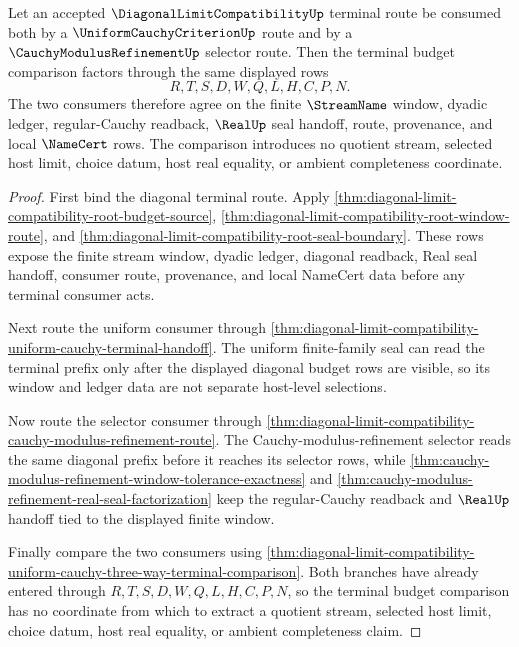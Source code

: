 \begin{theorem}
\label{thm:diagonal-limit-compatibility-terminal-modulus-budget-comparison}
Let an accepted $\DiagonalLimitCompatibilityUp$ terminal route be consumed both by a $\UniformCauchyCriterionUp$ route and by a $\CauchyModulusRefinementUp$ selector route. Then the terminal budget comparison factors through the same displayed rows
$$
R,T,S,D,W,Q,L,H,C,P,N.
$$
The two consumers therefore agree on the finite $\StreamName$ window, dyadic ledger, regular-Cauchy readback, $\RealUp$ seal handoff, route, provenance, and local $\NameCert$ rows. The comparison introduces no quotient stream, selected host limit, choice datum, host real equality, or ambient completeness coordinate.
\end{theorem}
\begin{proof}
First bind the diagonal terminal route. Apply \autoref{thm:diagonal-limit-compatibility-root-budget-source}, \autoref{thm:diagonal-limit-compatibility-root-window-route}, and \autoref{thm:diagonal-limit-compatibility-root-seal-boundary}. These rows expose the finite stream window, dyadic ledger, diagonal readback, Real seal handoff, consumer route, provenance, and local NameCert data before any terminal consumer acts.

Next route the uniform consumer through \autoref{thm:diagonal-limit-compatibility-uniform-cauchy-terminal-handoff}. The uniform finite-family seal can read the terminal prefix only after the displayed diagonal budget rows are visible, so its window and ledger data are not separate host-level selections.

Now route the selector consumer through \autoref{thm:diagonal-limit-compatibility-cauchy-modulus-refinement-route}. The Cauchy-modulus-refinement selector reads the same diagonal prefix before it reaches its selector rows, while \autoref{thm:cauchy-modulus-refinement-window-tolerance-exactness} and \autoref{thm:cauchy-modulus-refinement-real-seal-factorization} keep the regular-Cauchy readback and $\RealUp$ handoff tied to the displayed finite window.

Finally compare the two consumers using \autoref{thm:diagonal-limit-compatibility-uniform-cauchy-three-way-terminal-comparison}. Both branches have already entered through $R,T,S,D,W,Q,L,H,C,P,N$, so the terminal budget comparison has no coordinate from which to extract a quotient stream, selected host limit, choice datum, host real equality, or ambient completeness claim.
\end{proof}

